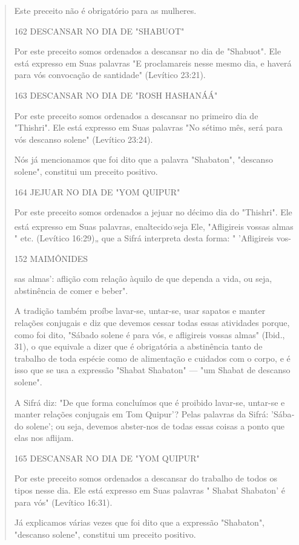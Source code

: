 \begin{quote}
Este preceito não é obrigatório para as mulheres.

162 DESCANSAR NO DIA DE "SHABUOT"

Por este preceito somos ordenados a descansar no dia de "Shabuot". Ele
está expresso em Suas palavras "E proclamareis nesse mesmo dia, e haverá
para vós convocação de santidade" (Levítico 23:21).

163 DESCANSAR NO DIA DE "ROSH HASHANÁÁ"

Por este preceito somos ordenados a descansar no primeiro dia de
"Thishri". Ele está expresso em Suas palavras "No sétimo mês, será para
vós descanso solene" (Levítico 23:24).

Nós já mencionamos que foi dito que a palavra "Shabaton", "des­canso
solene", constitui um preceito positivo.

164 JEJUAR NO DIA DE "YOM QUIPUR"

Por este preceito somos ordenados a jejuar no décimo dia do "This­hri".
Ele está expresso em Suas palavras, enaltecido\textsuperscript{.}seja
Ele, "Afligireis vossas almas " etc. (Levítico 16:29)„ que a Sifrá
interpreta desta forma: " 'Afligireis vos-

152 MAIMÔNIDES

sas almas': aflição com relação àquilo de que dependa a vida, ou seja,
abstinên­cia de comer e beber".

A tradição também proíbe lavar-se, untar-se, usar sapatos e manter
relações conjugais e diz que devemos cessar todas essas atividades
porque, co­mo foi dito, "Sábado solene é para vós, e afligireis vossas
almas" (Ibid., 31), o que equivale a dizer que é obrigatória a
abstinência tanto de trabalho de toda espécie como de alimentação e
cuidados com o corpo, e é isso que se usa a expressão "Shabat Shabaton"
--- "um Shabat de descanso solene".

A Sifrá diz: "De que forma concluímos que é proibido lavar-se, untar-se
e manter relações conjugais em Tom Quipur'? Pelas palavras da Sifrá:
'Sába­do solene'; ou seja, devemos abster-nos de todas essas coisas a
ponto que elas nos aflijam.

165 DESCANSAR NO DIA DE "YOM QUIPUR"

Por este preceito somos ordenados a descansar do trabalho de to­dos os
tipos nesse dia. Ele está expresso em Suas palavras " Shabat Shabaton' é
para vós" (Levítico 16:31).

Já explicamos várias vezes que foi dito que a expressão "Shabaton",
"descanso solene", constitui um preceito positivo.


\end{quote}
